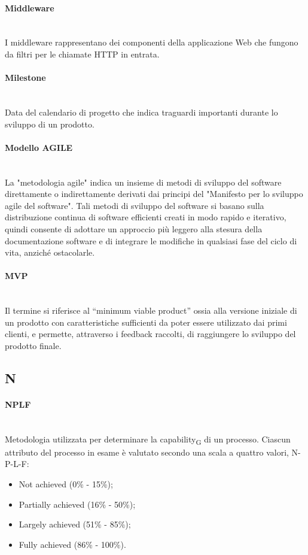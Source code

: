 \paragraph{Middleware}~\smallskip \\
I middleware rappresentano dei componenti della applicazione Web che fungono da filtri per le chiamate HTTP in entrata.

\paragraph{Milestone}~\smallskip \\
Data del calendario di progetto che indica traguardi importanti durante lo sviluppo di un prodotto.

\paragraph{Modello AGILE}~\smallskip \\
La "metodologia agile" indica un insieme di metodi di sviluppo del software direttamente o indirettamente derivati dai principi del "Manifesto per lo sviluppo agile del software".
Tali metodi di sviluppo del software si basano sulla distribuzione continua di software efficienti creati in modo rapido e iterativo, quindi
consente di adottare un approccio più leggero alla stesura della documentazione software e di integrare le modifiche in qualsiasi fase del ciclo di vita, anziché ostacolarle.

\paragraph{MVP}~\smallskip \\
Il termine si riferisce al “minimum viable product” ossia alla versione iniziale di un prodotto con 
caratteristiche sufficienti da poter essere utilizzato dai primi clienti, e permette, attraverso i feedback raccolti, di raggiungere lo sviluppo del prodotto finale.
\newpage
{}
\subsection*{N}
\paragraph{NPLF}~\smallskip \\
Metodologia utilizzata per determinare la capability\textsubscript{G} di un processo. Ciascun attributo del processo in esame è valutato secondo una scala a quattro valori, N-P-L-F:
\begin{itemize}
	\item Not achieved (0\% - 15\%);
	\item Partially achieved (16\% - 50\%);
	\item Largely achieved (51\% - 85\%);
    \item Fully achieved (86\% - 100\%).
\end{itemize}
\newpage
{}
